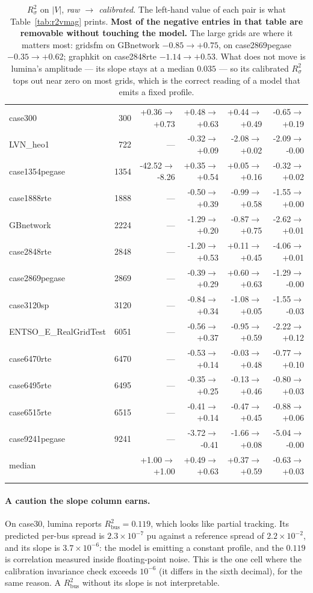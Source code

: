 \documentclass[10pt]{article}
\begin{document}
\begin{longtable}{lrrrrr}
case300 & 300 & +0.36$\to$+0.73 & +0.48$\to$+0.63 & +0.44$\to$+0.49 & -0.65$\to$+0.19 \\
LVN\_heo1 & 722 & --- & -0.32$\to$+0.09 & -2.08$\to$+0.02 & -2.09$\to$-0.00 \\
case1354pegase & 1354 & -42.52$\to$-8.26 & +0.35$\to$+0.54 & +0.05$\to$+0.16 & -0.32$\to$+0.02 \\
case1888rte & 1888 & --- & -0.50$\to$+0.39 & -0.99$\to$+0.58 & -1.55$\to$+0.00 \\
GBnetwork & 2224 & --- & -1.29$\to$+0.20 & -0.87$\to$+0.75 & -2.62$\to$+0.01 \\
case2848rte & 2848 & --- & -1.20$\to$+0.53 & +0.11$\to$+0.45 & -4.06$\to$+0.01 \\
case2869pegase & 2869 & --- & -0.39$\to$+0.29 & +0.60$\to$+0.63 & -1.29$\to$-0.00 \\
case3120sp & 3120 & --- & -0.84$\to$+0.34 & -1.08$\to$+0.05 & -1.55$\to$-0.03 \\
ENTSO\_E\_RealGridTest & 6051 & --- & -0.56$\to$+0.37 & -0.95$\to$+0.59 & -2.22$\to$+0.12 \\
case6470rte & 6470 & --- & -0.53$\to$+0.14 & -0.03$\to$+0.48 & -0.77$\to$+0.10 \\
case6495rte & 6495 & --- & -0.35$\to$+0.25 & -0.13$\to$+0.46 & -0.80$\to$+0.03 \\
case6515rte & 6515 & --- & -0.41$\to$+0.14 & -0.47$\to$+0.45 & -0.88$\to$+0.06 \\
case9241pegase & 9241 & --- & -3.72$\to$-0.41 & -1.66$\to$+0.08 & -5.04$\to$-0.00 \\
\midrule
median & & +1.00$\to$+1.00 & +0.49$\to$+0.63 & +0.37$\to$+0.59 & -0.63$\to$+0.03 \\
\bottomrule
\caption{$R^2_{\sigma}$ on $|V|$, \emph{raw $\to$ calibrated}.  The left-hand
value of each pair is what Table~\ref{tab:r2vmag} prints.  \textbf{Most of the
negative entries in that table are removable without touching the model.}  The
large grids are where it matters most: gridsfm on GBnetwork
$-0.85\to+0.75$, on case2869pegase $-0.35\to+0.62$; graphkit on case2848rte
$-1.14\to+0.53$.  What does not move is lumina's amplitude --- its slope stays
at a median $0.035$ --- so its calibrated $R^2_{\sigma}$ tops out near zero on
most grids, which is the correct reading of a model that emits a fixed profile.}
\label{tab:r2sigcal}
\end{longtable}

\paragraph{A caution the slope column earns.}  On case30, lumina reports
$R^2_{\mathrm{bus}} = 0.119$, which looks like partial tracking.  Its predicted
per-bus spread is $2.3\times10^{-7}$ pu against a reference spread of
$2.2\times10^{-2}$, and its slope is $3.7\times10^{-6}$: the model is emitting a
constant profile, and the $0.119$ is correlation measured inside floating-point
noise.  This is the one cell where the calibration invariance check exceeds
$10^{-6}$ (it differs in the sixth decimal), for the same reason.  A
$R^2_{\mathrm{bus}}$ without its slope is not interpretable.
\end{document}
